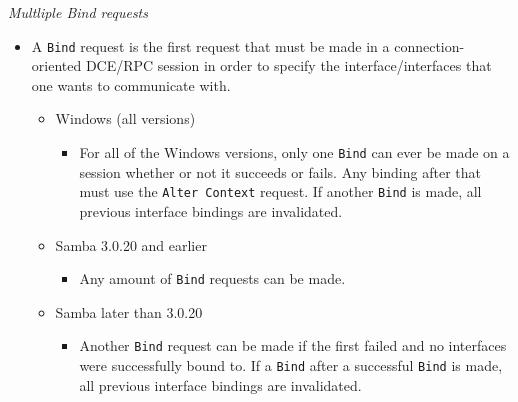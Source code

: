 \documentclass[english]{report}
\begin{document}
\textit{Multliple Bind requests}
\begin{itemize}

\item[] A \texttt{Bind} request is the first request that must be made in a
connection-oriented DCE/RPC session in order to specify the
interface/interfaces that one wants to communicate with.

\begin{itemize}
\item[] Windows (all versions)
\begin{itemize}

\item[] For all of the Windows versions, only one \texttt{Bind} can ever be
made on a session whether or not it succeeds or fails. Any binding after that
must use the \texttt{Alter Context} request.  If another \texttt{Bind} is made,
all previous interface bindings are invalidated.

\end{itemize}
\item[] Samba 3.0.20 and earlier
\begin{itemize}
\item[] Any amount of \texttt{Bind} requests can be made.
\end{itemize}
\item[] Samba later than 3.0.20
\begin{itemize}

\item[] Another \texttt{Bind} request can be made if the first failed and no
interfaces were successfully bound to. If a \texttt{Bind} after a successful
\texttt{Bind} is made, all previous interface bindings are invalidated.

\end{itemize}
\end{itemize}
\end{itemize}
\end{document}
